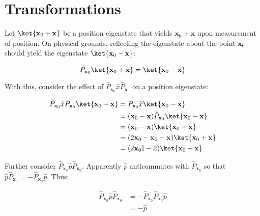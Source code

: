 \documentclass[12pt]{article}
\begin{document}



\pagebreak
\section*{Transformations}


Let $\ket{\mathbf{x}_{0} + \mathbf{x}}$ be a position eigenstate that yields $\mathbf{x}_{0} + \mathbf{x}$ upon measurement of position. On physical grounds, reflecting the eigenstate about the point $\mathbf{x}_{0}$ should yield the eigenstate $\ket{\mathbf{x}_{0} - \mathbf{x}}$:

\begin{equation}
    \hat{P}_{\mathbf{x}_{0}} \ket{\mathbf{x}_{0} + \mathbf{x}} = \ket{\mathbf{x}_{0} - \mathbf{x}}
\end{equation}

With this, consider the effect of $\hat{P}_{\mathbf{x}_{0}} \hat{x} \hat{P}_{\mathbf{x}_{0}}$ on a position eigenstate:

\begin{equation}
\begin{split}
    \hat{P}_{\mathbf{x}_{0}} \hat{x} \hat{P}_{\mathbf{x}_{0}}\ket{\mathbf{x}_{0} + \mathbf{x}} &= \hat{P}_{\mathbf{x}_{0}} \hat{x} \ket{\mathbf{x}_{0} - \mathbf{x}} \\
    &= (\mathbf{x}_{0} - \mathbf{x}) \hat{P}_{\mathbf{x}_{0}} \ket{\mathbf{x}_{0} - \mathbf{x}} \\
    &= (\mathbf{x}_{0} - \mathbf{x}) \ket{\mathbf{x}_{0} + \mathbf{x}} \\
    &= (2\mathbf{x}_{0} - \mathbf{x}_{0} - \mathbf{x}) \ket{\mathbf{x}_{0} + \mathbf{x}} \\
    &= (2\mathbf{x}_{0} \mathbb{I} - \hat{x}) \ket{\mathbf{x}_{0} + \mathbf{x}}
\end{split}
\end{equation}

Further consider $\hat{P}_{\mathbf{x}_{0}} \hat{p} \hat{P}_{\mathbf{x}_{0}}$. Apparently $\hat{p}$ anticommutes with $\hat{P}_{\mathbf{x}_{0}}$ so that $\hat{p} \hat{P}_{\mathbf{x}_{0}} = -\hat{P}_{\mathbf{x}_{0}} \hat{p}$. Thus:

\begin{equation}
\begin{split}
    \hat{P}_{\mathbf{x}_{0}} \hat{p} \hat{P}_{\mathbf{x}_{0}} &= -\hat{P}_{\mathbf{x}_{0}} \hat{P}_{\mathbf{x}_{0}} \hat{p} \\
    &= -\hat{p}
\end{split}
\end{equation}
\end{document}
